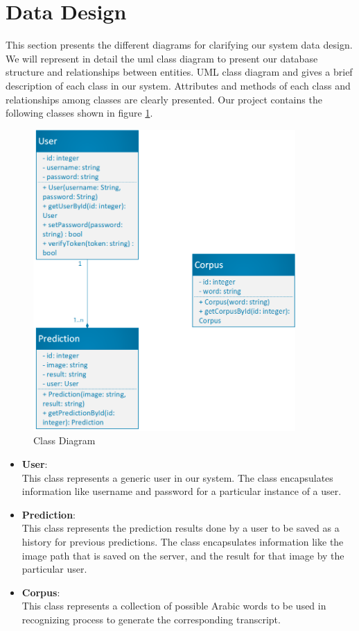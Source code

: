 \section{Data Design}
This section presents the different diagrams for clarifying our system data design. We will represent in detail the \acrshort{uml} class diagram to present our database structure and relationships between entities. UML class diagram and gives a brief description of each class in our system. Attributes and methods of each class and relationships among classes are clearly presented. Our project contains the following classes shown in figure \ref{fig:class-digram}.

\begin{figure}[!htb]
    \centering
    \includegraphics[width=10cm]{images/class diagram.png}
    \caption{Class Diagram}
    \label{fig:class-digram}
\end{figure}

\begin{itemize}[itemsep=1pt, topsep=5pt]
    \item   \textbf{User}: \\
    This class represents a generic user in our system. The class encapsulates information like username and password for a particular instance of a user.
    \item   \textbf{Prediction}: \\
    This class represents the prediction results done by a user to be saved as a history for previous predictions. The class encapsulates information like the image path that is saved on the server, and the result for that image by the particular user. 
    \item   \textbf{Corpus}: \\
    This class represents a collection of possible Arabic words to be used in recognizing process to generate the corresponding transcript.
\end{itemize}  

